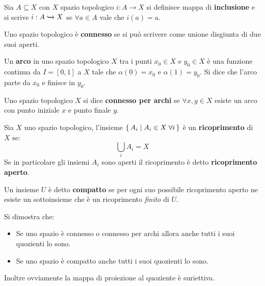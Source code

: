 \begin{definition}
  Sia $ A \subseteq X $ con $ X $ spazio topologico $ i: A \to X $ si definisce mappa di \textbf{inclusione}
  e si scrive $ i: A \xhookrightarrow{} X $ se $ \forall a \in A $ vale che $ i(a) = a $.
\end{definition}

\begin{osservation}
  Uno spazio topologico è \textbf{connesso} se si può scrivere come
  unione disgiunta di due suoi aperti.
\end{osservation}

\begin{definition}
  Un \textbf{arco} in uno spazio topologico $ X $ tra i punti $ x_0 \in X $ e $ y_0 \in X $
  è una funzione continua da $ I = [0,1] $ a $ X $ tale che $ \alpha(0) = x_0 $ e $ \alpha(1) = y_0 $.
  Si dice che l'arco parte da $ x_0 $ e finisce in $ y_0 $.
\end{definition}

\begin{definition}
  Uno spazio topologico $ X $ si dice \textbf{connesso per archi} se $ \forall x, y \in X $ esiste un arco con punto iniziale
  $ x $ e punto finale $ y $.
\end{definition}

\begin{definition}
  Sia $ X $ uno spazio topologico, l'insieme $ \set{A_i | A_i \in X \; \forall i} $ è un \textbf{ricoprimento}
  di $ X $ se:
  \[
    \bigcup_{i} A_i = X
  \]
  Se in particolare gli insiemi $ A_i $ sono aperti il ricoprimento è detto \textbf{ricoprimento aperto}.
\end{definition}

\begin{definition}
  Un insieme $ U $ è detto \textbf{compatto} se per ogni suo possibile ricoprimento
  aperto ne esiste un sottoinsieme che è un ricoprimento \emph{finito} di $ U $.
\end{definition}

\begin{proposition}
  Si dimostra che:
  \begin{itemize}
  \item Se uno spazio è connesso o connesso per archi allora anche tutti i suoi quozienti lo sono.
  \item Se uno spazio è compatto anche tutti i suoi quozienti lo sono.
  \end{itemize}
  Inoltre ovviamente la mappa di proiezione al quoziente è suriettiva.
\end{proposition}

